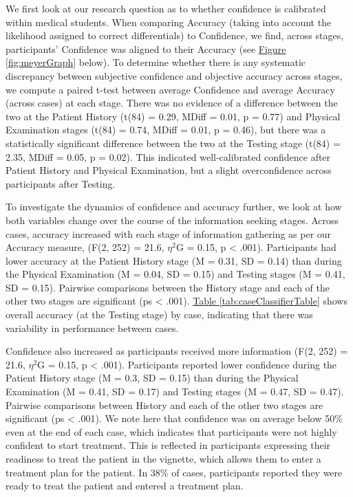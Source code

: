 \documentclass[a4paper, nobind]{templates/ociamthesis}
\begin{document}
We first look at our research question as to whether confidence is calibrated within medical students. When comparing Accuracy (taking into account the likelihood assigned to correct differentials) to Confidence, we find, across stages, participants' Confidence was aligned to their Accuracy (see \hyperref[fig:meyerGraph]{Figure \ref{fig:meyerGraph}} below). To determine whether there is any systematic discrepancy between subjective confidence and objective accuracy across stages, we compute a paired t-test between average Confidence and average Accuracy (across cases) at each stage. There was no evidence of a difference between the two at the Patient History (t(84) = 0.29, MDiff = 0.01, p = 0.77) and Physical Examination stages (t(84) = 0.74, MDiff = 0.01, p = 0.46), but there was a statistically significant difference between the two at the Testing stage (t(84) = 2.35, MDiff = 0.05, p = 0.02). This indicated well-calibrated confidence after Patient History and Physical Examination, but a slight overconfidence across participants after Testing.

\hfill\break
To investigate the dynamics of confidence and accuracy further, we look at how both variables change over the course of the information seeking stages. Across cases, accuracy increased with each stage of information gathering as per our Accuracy measure, (F(2, 252) = 21.6, \(\eta^2\)G = 0.15, p \textless{} .001). Participants had lower accuracy at the Patient History stage (M = 0.31, SD = 0.14) than during the Physical Examination (M = 0.04, SD = 0.15) and Testing stages (M = 0.41, SD = 0.15). Pairwise comparisons between the History stage and each of the other two stages are significant (ps \textless{} .001). \hyperref[tab:caseClassifierTable]{Table \ref{tab:caseClassifierTable}} shows overall accuracy (at the Testing stage) by case, indicating that there was variability in performance between cases.

\hfill\break
Confidence also increased as participants received more information (F(2, 252) = 21.6, \(\eta^2\)G = 0.15, p \textless{} .001). Participants reported lower confidence during the Patient History stage (M = 0.3, SD = 0.15) than during the Physical Examination (M = 0.41, SD = 0.17) and Testing stages (M = 0.47, SD = 0.47). Pairwise comparisons between History and each of the other two stages are significant (ps \textless{} .001). We note here that confidence was on average below 50\% even at the end of each case, which indicates that participants were not highly confident to start treatment. This is reflected in participants expressing their readiness to treat the patient in the vignette, which allows them to enter a treatment plan for the patient. In 38\% of cases, participants reported they were ready to treat the patient and entered a treatment plan.
\end{document}
